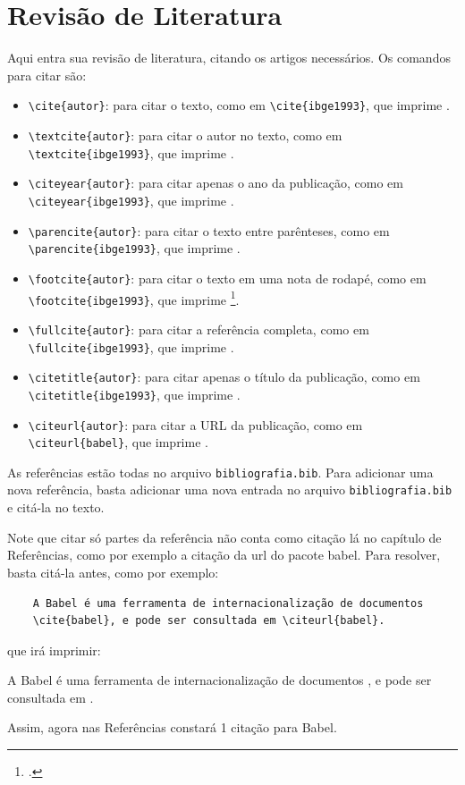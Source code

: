 \chapter{Revisão de Literatura}\label{cap:metodologia}

Aqui entra sua revisão de literatura, citando os artigos necessários. Os comandos para citar são:

\begin{itemize}
	\item \texttt{\textbackslash cite\{autor\}}: para citar o texto, como em \verb|\cite{ibge1993}|, que imprime \cite{ibge1993}.
	\item \texttt{\textbackslash textcite\{autor\}}: para citar o autor no texto, como em \verb|\textcite{ibge1993}|, que imprime \textcite{ibge1993}.
	\item \texttt{\textbackslash citeyear\{autor\}}: para citar apenas o ano da publicação, como em \verb|\citeyear{ibge1993}|, que imprime \citeyear{ibge1993}.
	\item \texttt{\textbackslash parencite\{autor\}}: para citar o texto entre parênteses, como em \verb|\parencite{ibge1993}|, que imprime \parencite{ibge1993}.
	\item \texttt{\textbackslash footcite\{autor\}}: para citar o texto em uma nota de rodapé, como em \verb|\footcite{ibge1993}|, que imprime \footcite{ibge1993}.
	\item \texttt{\textbackslash fullcite\{autor\}}: para citar a referência completa, como em \verb||, que imprime \fullcite{ibge1993}.
	\item \texttt{\textbackslash citetitle\{autor\}}: para citar apenas o título da publicação, como em \verb||, que imprime \citetitle{ibge1993}.
	\item \texttt{\textbackslash citeurl\{autor\}}: para citar a URL da publicação, como em \verb||, que imprime \citeurl{babel}.
\end{itemize}

As referências estão todas no arquivo \texttt{bibliografia.bib}. Para adicionar uma nova referência, basta adicionar uma nova entrada no arquivo \texttt{bibliografia.bib} e citá-la no texto.

Note que citar só partes da referência não conta como citação lá no capítulo de Referências, como por exemplo a citação da url do pacote babel.
Para resolver, basta citá-la antes, como por exemplo:

\begin{center}
\begin{verbatim}
	A Babel é uma ferramenta de internacionalização de documentos
	\cite{babel}, e pode ser consultada em \citeurl{babel}.		
\end{verbatim}
\end{center}

que irá imprimir:

\begin{center}
	A Babel é uma ferramenta de internacionalização de documentos \cite{babel}, e pode ser consultada em .	
\end{center}

Assim, agora nas Referências constará 1 citação para Babel.